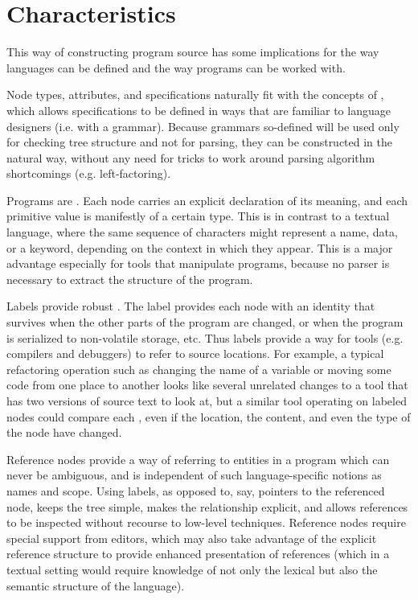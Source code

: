 


\section{Characteristics}
This way of constructing program source has some implications for the way languages can be defined and the way programs can be worked with.

Node types, attributes, and specifications naturally fit with the concepts of , which allows specifications to be defined in ways that are familiar to language designers (i.e. with a grammar). Because grammars so-defined will be used only for checking tree structure and not for parsing, they can be constructed in the natural way, without any need for tricks to work around parsing algorithm shortcomings (e.g. left-factoring).

Programs are . Each node carries an explicit declaration of its meaning, and each primitive value is manifestly of a certain type. This is in contrast to a textual language, where the same sequence of characters might represent a name, data, or a keyword, depending on the context in which they appear. This is a major advantage especially for tools that manipulate programs, because no parser is necessary to extract the structure of the program.

Labels provide robust . The label provides each node with an identity that survives when the other parts of the program are changed, or when the program is serialized to non-volatile storage, etc. Thus labels provide a way for tools (e.g. compilers and debuggers) to refer to source locations. For example, a typical refactoring operation such as changing the name of a variable or moving some code from one place to another looks like several unrelated changes to a  tool that has two versions of source text to look at, but a similar tool operating on labeled nodes could compare each , even if the location, the content, and even the type of the node have changed.

Reference nodes provide a way of referring to entities in a program which can never be ambiguous, and is independent of such language-specific notions as names and scope. Using labels, as opposed to, say, pointers to the referenced node, keeps the tree simple, makes the relationship explicit, and allows references to be inspected without recourse to low-level techniques. Reference nodes require special support from editors, which may also take advantage of the explicit reference structure to provide enhanced presentation of references (which in a textual setting would require knowledge of not only the lexical but also the semantic structure of the language).

